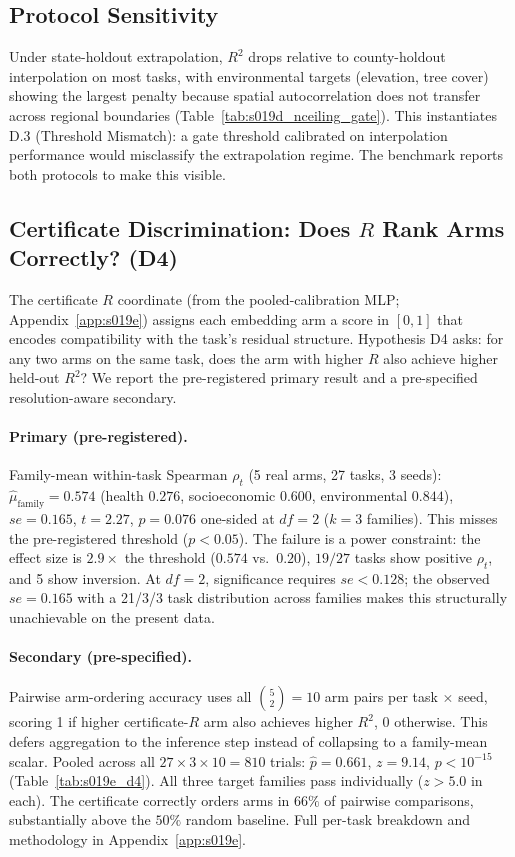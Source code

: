 \documentclass{article}
\begin{document}
\subsection{Protocol Sensitivity}

Under state-holdout extrapolation, $R^2$ drops relative to county-holdout interpolation on most tasks, with environmental targets (elevation, tree cover) showing the largest penalty because spatial autocorrelation does not transfer across regional boundaries (Table~\ref{tab:s019d_nceiling_gate}). This instantiates D.3 (Threshold Mismatch): a gate threshold calibrated on interpolation performance would misclassify the extrapolation regime. The benchmark reports both protocols to make this visible.

\subsection{Certificate Discrimination: Does $R$ Rank Arms Correctly? (D4)}
\label{sec:d4}

The certificate $R$ coordinate (from the pooled-calibration MLP; Appendix~\ref{app:s019e}) assigns each embedding arm a score in $[0,1]$ that encodes compatibility with the task's residual structure. Hypothesis D4 asks: for any two arms on the same task, does the arm with higher $R$ also achieve higher held-out $R^2$? We report the pre-registered primary result and a pre-specified resolution-aware secondary.

\paragraph{Primary (pre-registered).} Family-mean within-task Spearman $\rho_t$ (5 real arms, 27 tasks, 3 seeds): $\hat{\mu}_{\text{family}} = 0.574$ (health $0.276$, socioeconomic $0.600$, environmental $0.844$), $se = 0.165$, $t = 2.27$, $p = 0.076$ one-sided at $df = 2$ ($k = 3$ families). This misses the pre-registered threshold ($p < 0.05$). The failure is a power constraint: the effect size is $2.9{\times}$ the threshold ($0.574$ vs.\ $0.20$), $19/27$ tasks show positive $\rho_t$, and 5 show inversion. At $df = 2$, significance requires $se < 0.128$; the observed $se = 0.165$ with a 21/3/3 task distribution across families makes this structurally unachievable on the present data.

\paragraph{Secondary (pre-specified).} Pairwise arm-ordering accuracy uses all $\binom{5}{2} = 10$ arm pairs per task $\times$ seed, scoring 1 if higher certificate-$R$ arm also achieves higher $R^2$, 0 otherwise. This defers aggregation to the inference step instead of collapsing to a family-mean scalar. Pooled across all $27 \times 3 \times 10 = 810$ trials: $\hat{p} = 0.661$, $z = 9.14$, $p < 10^{-15}$ (Table~\ref{tab:s019e_d4}). All three target families pass individually ($z > 5.0$ in each). The certificate correctly orders arms in $66\%$ of pairwise comparisons, substantially above the $50\%$ random baseline. Full per-task breakdown and methodology in Appendix~\ref{app:s019e}.
\end{document}
